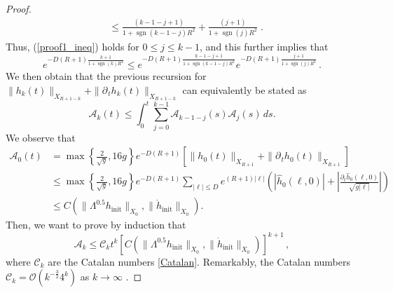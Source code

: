 \documentclass[11pt]{article}
\theoremstyle{plain}
\theoremstyle{definition}
\theoremstyle{definition}
\def\O{{\mathcal O}}
\def\p{\text{\bf\emph{p}}}
\DeclareMathOperator{\sgn}{sgn}
\def\ft #1{{\widehat{#1}}}
\def\p{{\partial\hspace{1pt}}}
\def\hinit{h_{\operatorname{init}}}
\def\htinit{{\dot h}_{\operatorname{init}}}
\begin{document}
\begin{proof}
\begin{align*}
&\leq \frac{\left(k-1-j+1\right)}{1+\sgn(k-1-j)R^2}+\frac{(j+1)}{1+\sgn(j)R^2}\;.
\end{align*}
Thus, (\ref{proof1_ineq}) holds for $0\leq j\leq k-1$, and this further implies that
$$
e^{-D(R+1)\frac{k+1}{1+\sgn(k)R^2}}\leq e^{-D(R+1)\frac{k-1-j+1}{1+\sgn(k-1-j)R^2}}e^{-D(R+1)\frac{j+1}{1+\sgn(j)R^2}}\,.
$$
We then obtain that the previous recursion for $\|h_k(t)\|_{X_{R+1-k}}+\|\p_{\!t} h_k(t)\|_{X_{R+1-k}}$ can equivalently be stated as
$$
\mathscr{A}_k(t)\leq \int_0^t \sum_{j=0}^{k-1} \mathscr{A}_{k-1-j}(s)\mathscr{A}_{j}(s) \,ds.
$$
We observe that
\begin{align}
\mathscr{A}_0(t)&=\max\left\{\frac{2}{\sqrt{g}},16g\right\}e^{-D(R+1)}\left[\|h_0(t)\|_{X_{R+1}}+\|\p_{\!t} h_0(t)\|_{X_{R+1}}\right]\nonumber\\
&\leq \max\left\{\frac{2}{\sqrt{g}},16g\right\}e^{-D(R+1)}\sum_{|\ell|\leq D}e^{(R+1)|\ell|}\left(|\ft{h}_0(\ell,0)|+\left|\frac{\partial_t\ft{h}_{0}(\ell,0)}{\sqrt{g|\ell|}}\right|\right)\nonumber\\
&\leq C(\|\Lambda^{0.5}\hinit\|_{X_0},\|\htinit\|_{X_0}).\label{eq:aux3}
\end{align}
Then, we want to prove by induction that
\begin{equation}\label{rs1}
\mathscr{A}_k\leq  \mathcal{C}_kt^k\left[C(\|\Lambda^{0.5}\hinit\|_{X_0},\|\htinit\|_{X_0})\right]^{k+1} \,,
\end{equation}
where $\mathcal{C}_k$ are the Catalan numbers \eqref{Catalan}. Remarkably, the Catalan numbers $\mathcal{C}_k = \O(k^{-\frac{3}{2}} 4^k)$ as $k\to \infty$  \cite[page 136]{St2015}.


\end{proof}
\end{document}
